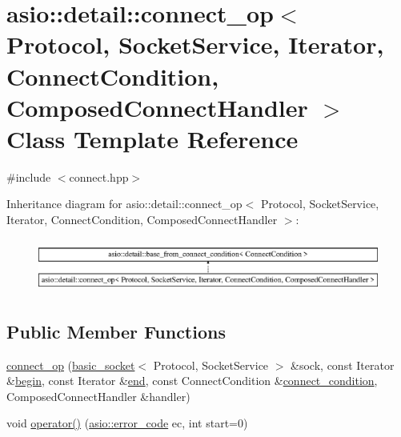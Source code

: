 \hypertarget{classasio_1_1detail_1_1connect__op}{}\section{asio\+:\+:detail\+:\+:connect\+\_\+op$<$ Protocol, Socket\+Service, Iterator, Connect\+Condition, Composed\+Connect\+Handler $>$ Class Template Reference}
\label{classasio_1_1detail_1_1connect__op}


{\ttfamily \#include $<$connect.\+hpp$>$}

Inheritance diagram for asio\+:\+:detail\+:\+:connect\+\_\+op$<$ Protocol, Socket\+Service, Iterator, Connect\+Condition, Composed\+Connect\+Handler $>$\+:\begin{figure}[H]
\begin{center}
\leavevmode
\includegraphics[height=1.774960cm]{classasio_1_1detail_1_1connect__op}
\end{center}
\end{figure}
\subsection*{Public Member Functions}
\begin{DoxyCompactItemize}
\item 
\hyperlink{classasio_1_1detail_1_1connect__op_a457fd005df6d071fd4961facdc6ce8f8}{connect\+\_\+op} (\hyperlink{classasio_1_1basic__socket}{basic\+\_\+socket}$<$ Protocol, Socket\+Service $>$ \&sock, const Iterator \&\hyperlink{group__async__connect_ga7055bca9225050c030c19c7dc926fa53}{begin}, const Iterator \&\hyperlink{group__async__connect_gadb6ad0193229ae84828688e812cd325c}{end}, const Connect\+Condition \&\hyperlink{group__async__connect_ga47e3dda205dfba3553f4c7e005897687}{connect\+\_\+condition}, Composed\+Connect\+Handler \&handler)
\item 
void \hyperlink{classasio_1_1detail_1_1connect__op_a10b7cf4ce856a75ebf1ad080551b3517}{operator()} (\hyperlink{classasio_1_1error__code}{asio\+::error\+\_\+code} ec, int start=0)
\end{DoxyCompactItemize}
